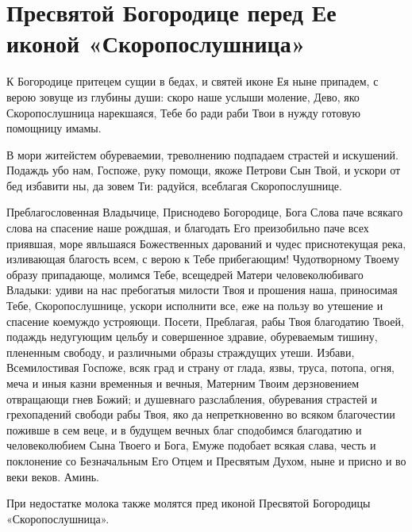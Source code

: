 \section{Пресвятой Богородице перед Ее иконой «Скоропослушница»}\begin{mymulticols}


К Богородице притецем сущии в бедах, и святей иконе Ея ныне припадем, с верою зовуще из глубины души: скоро наше услыши моление, Дево, яко Скоропослушница нарекшаяся, Тебе бо ради раби Твои в нужду готовую помощницу имамы.




В мори житейстем обуреваемии, треволнению подпадаем страстей и искушений. Подаждь убо нам, Госпоже, руку помощи, якоже Петрови Сын Твой, и ускори от бед избавити ны, да зовем Ти: радуйся, всеблагая Скоропослушнице.




Преблагословенная Владычице, Приснодево Богородице, Бога Слова паче всякаго слова на спасение наше рождшая, и благодать Его преизобильно паче всех приявшая, море явльшаяся Божественных дарований и чудес приснотекущая река, изливающая благость всем, с верою к Тебе прибегающим! Чудотворному Твоему образу припадающе, молимся Тебе, всещедрей Матери человеколюбиваго Владыки: удиви на нас пребогатыя милости Твоя и прошения наша, приносимая Тебе, Скоропослушнице, ускори исполнити все, еже на пользу во утешение и спасение коемуждо устрояющи. Посети, Преблагая, рабы Твоя благодатию Твоей, подаждь недугующим цельбу и совершенное здравие, обуреваемым тишину, плененным свободу, и различными образы страждущих утеши. Избави, Всемилостивая Госпоже, всяк град и страну от глада, язвы, труса, потопа, огня, меча и иныя казни временныя и вечныя, Матерним Твоим дерзновением отвращающи гнев Божий; и душевнаго разслабления, обуревания страстей и грехопадений свободи рабы Твоя, яко да непреткновенно во всяком благочестии поживше в сем веце, и в будущем вечных благ сподобимся благодатию и человеколюбием Сына Твоего и Бога, Емуже подобает всякая слава, честь и поклонение со Безначальным Его Отцем и Пресвятым Духом, ныне и присно и во веки веков. Аминь.

При недостатке молока также молятся пред иконой Пресвятой Богородицы «Скоропослушница».

\end{mymulticols}

